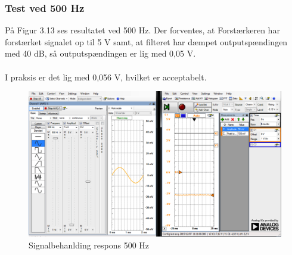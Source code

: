 \subsubsection{Test ved 500 Hz}
På Figur 3.13 ses resultatet ved 500 Hz. Der forventes, at Forstærkeren har forstærket signalet op til 5 V samt, at filteret har dæmpet outputspændingen med 40 dB, så outputspændingen er lig med 0,05 V.    
\\ \\
I praksis er det lig med 0,056 V, hvilket er acceptabelt. 

\begin{figure}[H]
	\centering
	\includegraphics[width=1\textwidth]{Figurer/Snip20151207_45}
	\caption{Signalbehanlding respons 500 Hz}
	\label{fig:Signalbehanlding}
\end{figure}




